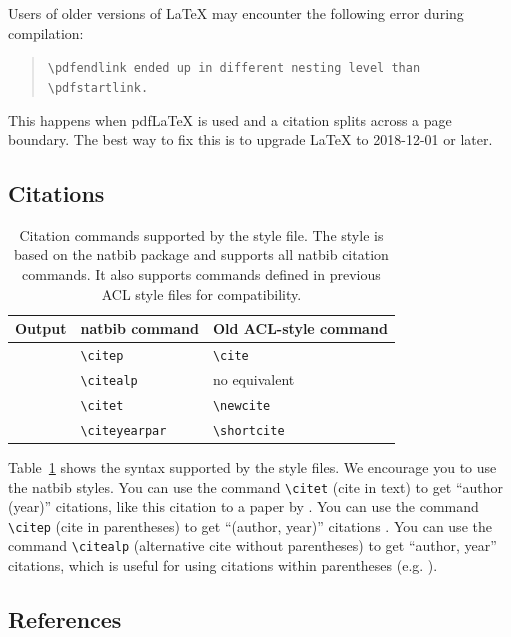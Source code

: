 \documentclass[11pt]{article}
\begin{document}
Users of older versions of \LaTeX{} may encounter the following error during compilation: 
\begin{quote}
\tt\verb|\pdfendlink| ended up in different nesting level than \verb|\pdfstartlink|.
\end{quote}
This happens when pdf\LaTeX{} is used and a citation splits across a page boundary. The best way to fix this is to upgrade \LaTeX{} to 2018-12-01 or later.

\subsection{Citations}

\begin{table}
\centering
\begin{tabular}{lll}
\hline
\textbf{Output} & \textbf{natbib command} & \textbf{Old ACL-style command}\\
\hline
\citep{Gusfield:97} & \verb|\citep| & \verb|\cite| \\
\citealp{Gusfield:97} & \verb|\citealp| & no equivalent \\
\citet{Gusfield:97} & \verb|\citet| & \verb|\newcite| \\
\citeyearpar{Gusfield:97} & \verb|\citeyearpar| & \verb|\shortcite| \\
\hline
\end{tabular}
\caption{\label{citation-guide}
Citation commands supported by the style file.
The style is based on the natbib package and supports all natbib citation commands.
It also supports commands defined in previous ACL style files for compatibility.
}
\end{table}

Table~\ref{citation-guide} shows the syntax supported by the style files.
We encourage you to use the natbib styles.
You can use the command \verb|\citet| (cite in text) to get ``author (year)'' citations, like this citation to a paper by \citet{Gusfield:97}.
You can use the command \verb|\citep| (cite in parentheses) to get ``(author, year)'' citations \citep{Gusfield:97}.
You can use the command \verb|\citealp| (alternative cite without parentheses) to get ``author, year'' citations, which is useful for using citations within parentheses (e.g. \citealp{Gusfield:97}).

\subsection{References}
\end{document}
